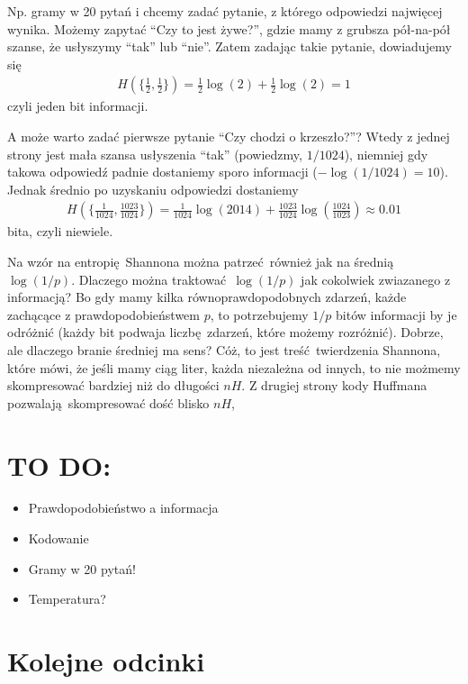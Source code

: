 \documentclass[10pt,a4paper]{article}
\begin{document}
Np. gramy w 20 pytań i chcemy zadać pytanie, z którego odpowiedzi najwięcej wynika. Możemy zapytać ``Czy to jest żywe?'', gdzie mamy z grubsza pół-na-pół szanse, że usłyszymy ``tak'' lub ``nie''.  Zatem zadając takie pytanie, dowiadujemy się
\begin{align}
H(\{ \tfrac{1}{2},\tfrac{1}{2}\}) = \tfrac{1}{2} \log(2) + \tfrac{1}{2} \log(2)  = 1
\end{align}
czyli jeden bit informacji. 

A może warto zadać pierwsze pytanie ``Czy chodzi o krzeszło?''? Wtedy z jednej strony jest mała szansa usłyszenia ``tak'' (powiedzmy, $1/1024$), niemniej gdy takowa odpowiedź padnie dostaniemy sporo informacji  ($-\log(1/1024)=10$). Jednak średnio po uzyskaniu odpowiedzi dostaniemy
\begin{align}
    H(\{ \tfrac{1}{1024},\tfrac{1023}{1024}\}) = \tfrac{1}{1024} \log(2014) + \tfrac{1023}{1024} \log(\tfrac{1024}{1023}) \approx 0.01
\end{align}
bita, czyli niewiele.

Na wzór na entropię Shannona można patrzeć również jak na średnią $\log(1/p)$. Dlaczego można traktować $\log(1/p)$ jak cokolwiek zwiazanego z informacją? Bo gdy mamy kilka równoprawdopodobnych zdarzeń, każde zachącące z prawdopodobieństwem $p$, to potrzebujemy $1/p$ bitów informacji by je odróżnić (każdy bit podwaja liczbę zdarzeń, które możemy rozróżnić). Dobrze, ale dlaczego branie średniej ma sens? Cóż, to jest treść twierdzenia Shannona, które mówi, że jeśli mamy ciąg liter, każda niezależna od innych, to nie możmemy skompresować bardziej niż do długości $n H$. Z drugiej strony kody Huffmana pozwalają skompresować dość blisko $n H$,


\section{TO DO:}

\begin{itemize}
    \item Prawdopodobieństwo a informacja
    \item Kodowanie
    \item Gramy w 20 pytań!
    \item Temperatura?
\end{itemize}

\section{Kolejne odcinki}
\end{document}

